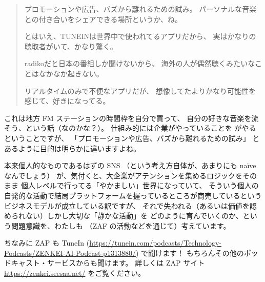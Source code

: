 \documentclass[dvipdfmx,autodetect-engine,10pt,b5paper,papersize,openany,dvipsnames]{jsbook}
\begin{document}
\begin{multicols}{2}
\begin{quotation}
  プロモーションや広告、バズから離れるための試み。
  パーソナルな音楽との付き合いをシェアできる場所というか、ね。

  とはいえ、TUNEINは世界中で使われてるアプリだから、
  実はかなりの聴取者がいて、かなり驚く。

  radikoだと日本の番組しか聞けないから、
  海外の人が偶然聴くみたいなことはなかなか起きない。

  リアルタイムのみで不便なアプリだが、
  想像してたよりかなり可能性を感じて、好きになってる。
\end{quotation}
これは地方 FM ステーションの時間枠を自分で買って、
自分の好きな音楽を流そう、という話（なのかな？）。
仕組み的には企業がやっていることを
がやるということですが、
「プロモーションや広告、バズから離れるための試み」
とあるように目的は明らかに違いますよね。

本来個人的なものであるはずの SNS
（という考え方自体が、あまりにも na\"{i}ve なんでしょう）
が、気付くと、大企業がアテンションを集めるロジックをそのまま
個人レベルで行ってる「やかましい」世界になっていて、
そういう個人の自発的な活動で結局プラットフォームを握っているところが商売しているという
ビジネスモデルが成立している訳ですが、
それで失われる（あるいは価値を認められない）しかし大切な「静かな活動」を
どのように育んでいくのか、という問題意識を、わたしも
（ZAF の活動などを通じて）考えています。
	  
ちなみに ZAP も TuneIn
(\url{https://tunein.com/podcasts/Technology-Podcasts/ZENKEI-AI-Podcast-p1313880/}) で聞けます！
もちろんその他のポッドキャスト・サービスからも聞けます。
詳しくは ZAP サイト \url{https://zenkei.seesaa.net/} をご覧ください。



\end{multicols}
\end{document}
